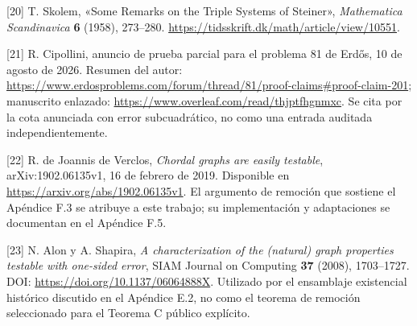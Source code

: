 \documentclass[spanish,11pt,a4paper]{article}
\begin{document}
{[}20{]} T. Skolem, «Some Remarks on the Triple Systems of Steiner», \emph{Mathematica Scandinavica} \textbf{6} (1958), 273--280. \url{https://tidsskrift.dk/math/article/view/10551}.

{[}21{]} R. Cipollini, anuncio de prueba parcial para el problema 81 de Erdős, 10 de agosto de 2026. Resumen del autor: \url{https://www.erdosproblems.com/forum/thread/81/proof-claims\#proof-claim-201}; manuscrito enlazado: \url{https://www.overleaf.com/read/thjptfhgnmxc}. Se cita por la cota anunciada con error subcuadrático, no como una entrada auditada independientemente.

{[}22{]} R. de Joannis de Verclos, \emph{Chordal graphs are easily testable}, arXiv:1902.06135v1, 16 de febrero de 2019. Disponible en \url{https://arxiv.org/abs/1902.06135v1}. El argumento de remoción que sostiene el Apéndice F.3 se atribuye a este trabajo; su implementación y adaptaciones se documentan en el Apéndice F.5.

{[}23{]} N. Alon y A. Shapira, \emph{A characterization of the (natural) graph properties testable with one-sided error}, SIAM Journal on Computing \textbf{37} (2008), 1703--1727. DOI: \url{https://doi.org/10.1137/06064888X}. Utilizado por el ensamblaje existencial histórico discutido en el Apéndice E.2, no como el teorema de remoción seleccionado para el Teorema C público explícito.

\endgroup
\end{document}
